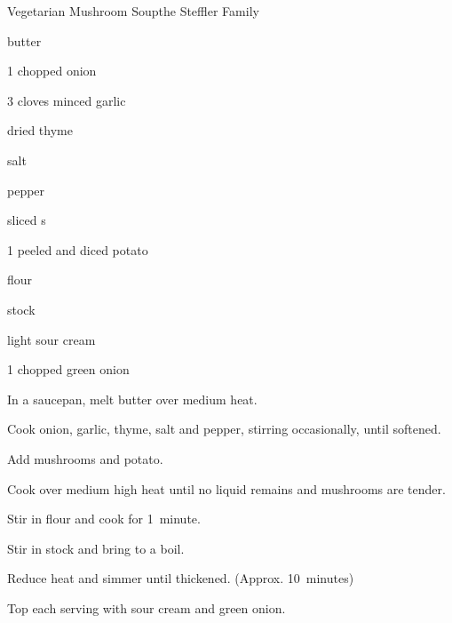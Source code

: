 \begin{recipe}{Vegetarian Mushroom Soup}{the Steffler Family}{}

\begin{ingredients}
\item {} butter
\item 1 chopped onion
\item 3 cloves minced garlic
\item \tp{\half} dried thyme
\item \tp{\quarter} salt
\item \tp{\quarter} pepper
\item {} sliced s
\item 1 peeled and diced potato
\item \C{\quarter} flour
\item {} stock
\item \C{\quarter} light sour cream
\item 1 chopped green onion
\end{ingredients}

\begin{directions}
\item In a saucepan, melt butter over medium heat.
\item Cook onion, garlic, thyme, salt and pepper, stirring occasionally, until softened.
\item Add mushrooms and potato.
\item Cook over medium high heat until no liquid remains and mushrooms are tender.
\item Stir in flour and cook for 1~minute.
\item Stir in stock and bring to a boil.
\item Reduce heat and simmer until thickened. (Approx. 10~minutes)
\item Top each serving with sour cream and green onion.
\end{directions}
\end{recipe}
